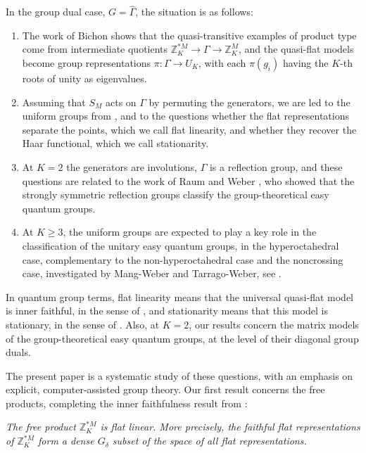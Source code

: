 \documentclass[12pt]{amsart}
\theoremstyle{definition}
\begin{document}
In the group dual case, $G=\widehat{\Gamma}$, the situation is as follows:

\begin{enumerate}
\item The work of Bichon \cite{bic} shows that the quasi-transitive examples of product type come from intermediate quotients $\mathbb Z_K^{*M}\to\Gamma\to\mathbb Z_K^M$, and the quasi-flat models become group representations $\pi:\Gamma\to U_K$, with each $\pi(g_i)$ having the $K$-th roots of unity as eigenvalues.

\item Assuming that $S_M$ acts on $\Gamma$ by permuting the generators, we are led to the uniform groups from \cite{bc1,bc2}, and to the questions whether the flat representations separate the points, which we call flat linearity, and whether they recover the Haar functional, which we call stationarity.

\item At $K=2$ the generators are involutions, $\Gamma$ is a reflection group, and these questions are related to the work of Raum and Weber \cite{rw2,rwe}, who showed that the strongly symmetric reflection groups classify the group-theoretical easy quantum groups.

\item At $K\geq3$, the uniform groups are expected to play a key role in the classification of the unitary easy quantum groups, in the hyperoctahedral case, complementary to the non-hyperoctahedral case and the noncrossing case, investigated by Mang-Weber and Tarrago-Weber, see \cite{mw1,tw}.
\end{enumerate}

In quantum group terms, flat linearity means that the universal quasi-flat model is inner faithful, in the sense of \cite{bbi}, and stationarity means that this model is stationary, in the sense of \cite{bfr}. Also, at $K=2$, our results concern the matrix models of the group-theoretical easy quantum groups, at the level of their diagonal group duals.

The present paper is a systematic study of these questions, with an emphasis on explicit, computer-assisted group theory. Our first result concerns the free products, completing the inner faithfulness result from \cite{bfr}:

\medskip

 {\em The free product $\mathbb Z_K^{*M}$ is flat linear. More precisely, the faithful flat representations of $\mathbb Z_K^{*M}$ form a dense $G_\delta$ subset of the space of all flat representations.}
\end{document}
